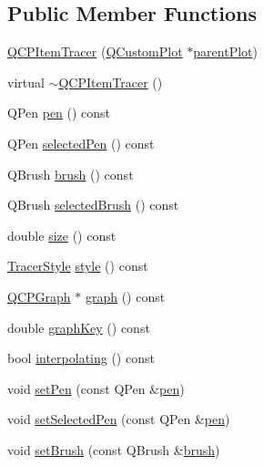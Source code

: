 \subsection*{Public Member Functions}
\begin{DoxyCompactItemize}
\item 
\hyperlink{classQCPItemTracer_adc5ca846eeac323db4aa1fc4081e36be}{Q\+C\+P\+Item\+Tracer} (\hyperlink{classQCustomPlot}{Q\+Custom\+Plot} $\ast$\hyperlink{classQCPLayerable_ab7e0e94461566093d36ffc0f5312b109}{parent\+Plot})
\item 
virtual \hyperlink{classQCPItemTracer_a43686565a9b70815915618636b9bdf0f}{$\sim$\+Q\+C\+P\+Item\+Tracer} ()
\item 
Q\+Pen \hyperlink{classQCPItemTracer_a1f51b61e98c276298a0874d5e89707f0}{pen} () const 
\item 
Q\+Pen \hyperlink{classQCPItemTracer_ad75e5d2d868dbedc176f7911091f379b}{selected\+Pen} () const 
\item 
Q\+Brush \hyperlink{classQCPItemTracer_af07527750cfb6afc3c0ba4bec012011f}{brush} () const 
\item 
Q\+Brush \hyperlink{classQCPItemTracer_afed284222253083375bfd21d3d4dbc30}{selected\+Brush} () const 
\item 
double \hyperlink{classQCPItemTracer_a2607fcb3d01e90773ea1532fd6803760}{size} () const 
\item 
\hyperlink{classQCPItemTracer_a2f05ddb13978036f902ca3ab47076500}{Tracer\+Style} \hyperlink{classQCPItemTracer_a871832dace1709f877c3136fac7ae1ec}{style} () const 
\item 
\hyperlink{classQCPGraph}{Q\+C\+P\+Graph} $\ast$ \hyperlink{classQCPItemTracer_a74c90da0e6730839b8d7cf6445a4ec1f}{graph} () const 
\item 
double \hyperlink{classQCPItemTracer_a361c5c9b93bdf4588fc49bc3097529ad}{graph\+Key} () const 
\item 
bool \hyperlink{classQCPItemTracer_ab318c233fa35c17a317af38ce7b3c312}{interpolating} () const 
\item 
void \hyperlink{classQCPItemTracer_af8048636fc1ef0152e51809b008df2ca}{set\+Pen} (const Q\+Pen \&\hyperlink{classQCPItemTracer_a1f51b61e98c276298a0874d5e89707f0}{pen})
\item 
void \hyperlink{classQCPItemTracer_ae1bf70db7f13f928660168cd3e5069f3}{set\+Selected\+Pen} (const Q\+Pen \&\hyperlink{classQCPItemTracer_a1f51b61e98c276298a0874d5e89707f0}{pen})
\item 
void \hyperlink{classQCPItemTracer_a2c303f7470a30084daa201ed556b3c36}{set\+Brush} (const Q\+Brush \&\hyperlink{classQCPItemTracer_af07527750cfb6afc3c0ba4bec012011f}{brush})

\end{DoxyCompactItemize}
